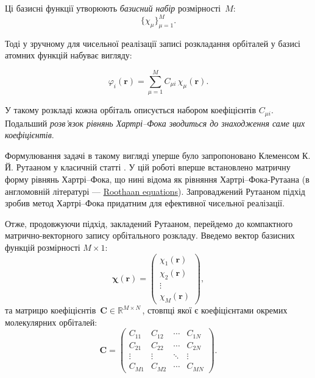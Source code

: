 Ці базисні функції утворюють \emph{базисний набір} розмірності~$M$:
\begin{equation*}
	\{\chi_\mu\}_{\mu=1}^{M}.
\end{equation*}

Тоді у зручному для чисельної реалізації записі
розкладання орбіталей у базисі атомних функцій набуває вигляду:


\begin{equation}\label{eq:orbital}
	\varphi_i(\mathbf{r}) = \sum_{\mu=1}^{M} C_{\mu i}\,\chi_\mu(\mathbf{r}).
\end{equation}

У такому розкладі кожна орбіталь описується набором коефіцієнтів $C_{\mu i}$. Подальший \emph{розв’язок рівнянь Хартрі–Фока зводиться до знаходження саме цих коефіцієнтів}.

\begin{commentbox}[]
	Формулювання задачі в такому вигляді уперше було запропоновано Клеменсом К. Й. Рутааном у класичній статті
	. У цій роботі вперше встановлено матричну форму рівнянь Хартрі–Фока,
	що нині відома як рівняння Хартрі–Фока-Рутаана (в англомовній літературі --- \href{https://en.wikipedia.org/wiki/Roothaan\_equations}{Roothaan equations}). Запроваджений Рутааном підхід зробив метод Хартрі–Фока придатним для ефективної чисельної реалізації.
\end{commentbox}

Отже, продовжуючи підхід, закладений Рутааном, перейдемо до компактного матрично-векторного запису орбітального розкладу. Введемо вектор базисних функцій розмірності $M\times 1$:
\[
	\boldsymbol{\chi}(\mathbf r)=
	\begin{pmatrix}
		\chi_1(\mathbf r) \\
		\chi_2(\mathbf r) \\
		\vdots            \\
		\chi_M(\mathbf r)
	\end{pmatrix},
\]
та матрицю коефіцієнтів $\,\mathbf C\in\mathbb R^{M\times N}\,$,
стовпці якої є коефіцієнтами окремих молекулярних орбіталей:
\[
	\mathbf C=
	\begin{pmatrix}
		C_{11} & C_{12} & \cdots & C_{1N} \\
		C_{21} & C_{22} & \cdots & C_{2N} \\
		\vdots & \vdots & \ddots & \vdots \\
		C_{M1} & C_{M2} & \cdots & C_{MN}
	\end{pmatrix}.
\]

